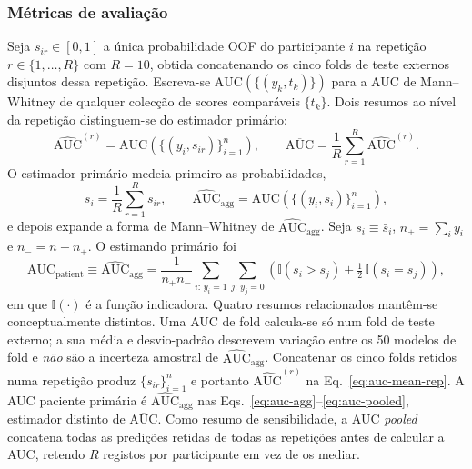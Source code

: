 \documentclass[review]{elsarticle}
\begin{document}
\subsubsection{Métricas de avaliação}
\label{subsubsec:evaluation-metrics}
Seja $s_{ir}\in[0,1]$ a única probabilidade OOF do participante $i$ na repetição $r\in\{1,\ldots,R\}$ com $R=10$, obtida concatenando os cinco folds de teste externos disjuntos dessa repetição.
Escreva-se $\mathrm{AUC}(\{(y_k,t_k)\})$ para a AUC de Mann--Whitney de qualquer colecção de scores comparáveis $\{t_k\}$.
Dois resumos ao nível da repetição distinguem-se do estimador primário:
\begin{equation}
\widehat{\mathrm{AUC}}^{(r)}
=
\mathrm{AUC}\!\left(\{(y_i,s_{ir})\}_{i=1}^{n}\right),
\qquad
\overline{\mathrm{AUC}}
=
\frac{1}{R}\sum_{r=1}^{R}\widehat{\mathrm{AUC}}^{(r)}.
\label{eq:auc-mean-rep}
\end{equation}
O estimador primário medeia primeiro as probabilidades,
\begin{equation}
\bar{s}_i
=
\frac{1}{R}\sum_{r=1}^{R}s_{ir},
\qquad
\widehat{\mathrm{AUC}}_{\mathrm{agg}}
=
\mathrm{AUC}\!\left(\{(y_i,\bar{s}_i)\}_{i=1}^{n}\right),
\label{eq:auc-agg}
\end{equation}
e depois expande a forma de Mann--Whitney de $\widehat{\mathrm{AUC}}_{\mathrm{agg}}$.
Seja $s_i\equiv\bar{s}_i$, $n_+=\sum_i y_i$ e $n_-=n-n_+$.
O estimando primário foi
\begin{equation}
\mathrm{AUC}_{\mathrm{patient}}
\equiv
\widehat{\mathrm{AUC}}_{\mathrm{agg}}
= \frac{1}{n_+ n_-}
\sum_{i:\,y_i=1} \sum_{j:\,y_j=0}
\left(
\mathbb{I}(s_i > s_j)
+ \tfrac{1}{2}\,\mathbb{I}(s_i = s_j)
\right),
\label{eq:auc-pooled}
\end{equation}
em que $\mathbb{I}(\cdot)$ é a função indicadora.
Quatro resumos relacionados mantêm-se conceptualmente distintos.
Uma AUC de fold calcula-se só num fold de teste externo; a sua média e desvio-padrão descrevem variação entre os 50 modelos de fold e \emph{não} são a incerteza amostral de $\widehat{\mathrm{AUC}}_{\mathrm{agg}}$.
Concatenar os cinco folds retidos numa repetição produz $\{s_{ir}\}_{i=1}^{n}$ e portanto $\widehat{\mathrm{AUC}}^{(r)}$ na Eq.~\eqref{eq:auc-mean-rep}.
A AUC paciente primária é $\widehat{\mathrm{AUC}}_{\mathrm{agg}}$ nas Eqs.~\eqref{eq:auc-agg}--\eqref{eq:auc-pooled}, estimador distinto de $\overline{\mathrm{AUC}}$.
Como resumo de sensibilidade, a AUC \emph{pooled} concatena todas as predições retidas de todas as repetições antes de calcular a AUC, retendo $R$ registos por participante em vez de os mediar.
\end{document}
